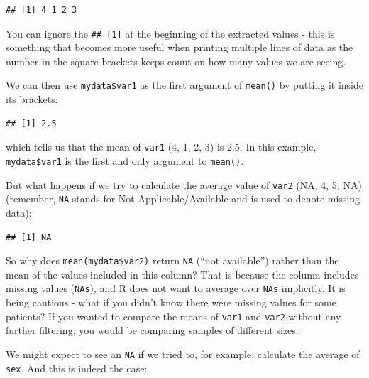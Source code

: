 \documentclass[
  12pt,
  krantz2]{krantz}
\makeatletter
\newenvironment{Shaded}{\begin{snugshade}}{\end{snugshade}}
\newcommand{\KeywordTok}[1]{\textcolor[rgb]{0.13,0.29,0.53}{\textbf{#1}}}
\newcommand{\NormalTok}[1]{#1}
\newcommand{\OperatorTok}[1]{\textcolor[rgb]{0.81,0.36,0.00}{\textbf{#1}}}
\newenvironment{kframe}{%
\medskip{}
\setlength{\fboxsep}{.8em}
 \def\at@end@of@kframe{}%
 \ifinner\ifhmode%
  \def\at@end@of@kframe{\end{minipage}}%
  \begin{minipage}{\columnwidth}%
 \fi\fi%
 \def\FrameCommand##1{\hskip\@totalleftmargin \hskip-\fboxsep
 \colorbox{shadecolor}{##1}\hskip-\fboxsep
     \hskip-\linewidth \hskip-\@totalleftmargin \hskip\columnwidth}%
 \MakeFramed {\advance\hsize-\width
   \@totalleftmargin\z@ \linewidth\hsize
   \@setminipage}}%
 {\par\unskip\endMakeFramed%
 \at@end@of@kframe}
\renewenvironment{Shaded}{\begin{kframe}}{\end{kframe}}
\makeatother
\begin{document}
\begin{verbatim}
## [1] 4 1 2 3
\end{verbatim}

You can ignore the \texttt{\#\#\ {[}1{]}} at the beginning of the extracted values - this is something that becomes more useful when printing multiple lines of data as the number in the square brackets keeps count on how many values we are seeing.

We can then use \texttt{mydata\$var1} as the first argument of \texttt{mean()} by putting it inside its brackets:

\begin{Shaded}
\end{Shaded}

\begin{verbatim}
## [1] 2.5
\end{verbatim}

which tells us that the mean of \texttt{var1} (4, 1, 2, 3) is 2.5.
In this example, \texttt{mydata\$var1} is the first and only argument to \texttt{mean()}.

But what happens if we try to calculate the average value of \texttt{var2} (NA, 4, 5, NA) (remember, \texttt{NA} stands for Not Applicable/Available and is used to denote missing data):

\begin{Shaded}
\end{Shaded}

\begin{verbatim}
## [1] NA
\end{verbatim}

So why does \texttt{mean(mydata\$var2)} return \texttt{NA} (``not available'') rather than the mean of the values included in this column?
That is because the column includes missing values (\texttt{NAs}), and R does not want to average over \texttt{NAs} implicitly.
It is being cautious - what if you didn't know there were missing values for some patients?
If you wanted to compare the means of \texttt{var1} and \texttt{var2} without any further filtering, you would be comparing samples of different sizes.

We might expect to see an \texttt{NA} if we tried to, for example, calculate the average of \texttt{sex}.
And this is indeed the case:
\end{document}
